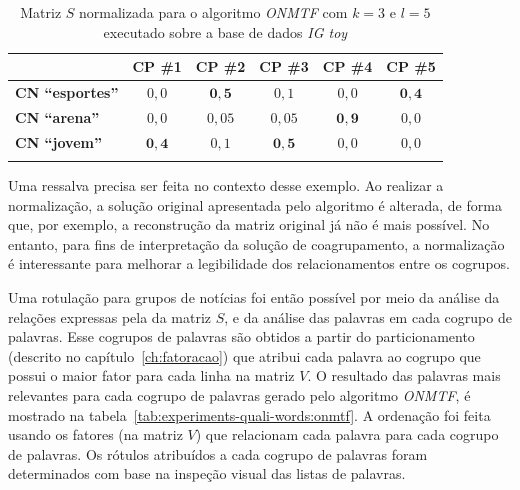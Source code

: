 \documentclass[
    12pt,                %
    oneside,            %
    a4paper,            %
    english,            %
    brazil                %
    ]{abntex2ppgsi}
\begin{document}
\begin{table}[H]
    \centering
    \caption{Matriz $S$ normalizada para o algoritmo \textit{ONMTF} com $k = 3$ e $l = 5$ executado sobre a base de dados \textit{IG toy}}
    \begin{tabular}{lccccc}
        \hline
         & \textbf{CP \#1} & \textbf{CP \#2} & \textbf{CP \#3} & \textbf{CP \#4} & \textbf{CP \#5} \\
        \hline
        \textbf{CN ``esportes''} & $0,0$ & $\mathbf{0,5}$  & $0,1$  & $0,0$ & $\mathbf{0,4}$ \\
        \textbf{CN ``arena''}    & $0,0$ & $0,05$ & $0,05$ & $\mathbf{0,9}$ & $0,0$ \\
        \textbf{CN ``jovem''}    & $\mathbf{0,4}$ & $0,1$  & $\mathbf{0,5}$  & $0,0$ & $0,0$ \\
        \hline \\
    \end{tabular}
    \label{tab:onmtf:matrizS}
\end{table}

Uma ressalva precisa ser feita no contexto desse exemplo. Ao realizar a normalização, a solução original apresentada pelo algoritmo é alterada, de forma que, por exemplo, a reconstrução da matriz original já não é mais possível. No entanto, para fins de interpretação da solução de coagrupamento, a normalização é interessante para melhorar a legibilidade dos relacionamentos entre os cogrupos.

Uma rotulação para grupos de notícias foi então possível por meio da análise da relações expressas pela da matriz $S$, e da análise das palavras em cada cogrupo de palavras. Esse cogrupos de palavras são obtidos a partir do particionamento (descrito no capítulo~\ref{ch:fatoracao}) que atribui cada palavra ao cogrupo que possui o maior fator para cada linha na matriz $V$. O resultado das palavras mais relevantes para cada cogrupo de palavras gerado pelo algoritmo \textit{ONMTF}, é mostrado na tabela~\ref{tab:experiments-quali-words:onmtf}. A ordenação foi feita usando os fatores (na matriz $V$) que relacionam cada palavra para cada cogrupo de palavras. Os rótulos atribuídos a cada cogrupo de palavras foram determinados com base na inspeção visual das listas de palavras.
\end{document}
